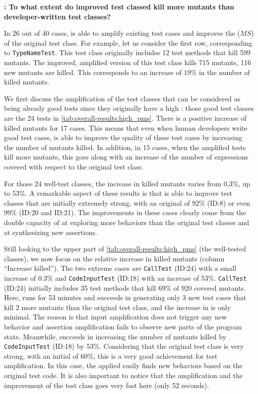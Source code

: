 \textbf{\rqeffectiveness: To what extent do improved test classed kill more mutants than developer-written test classes?}

In 26 out of 40 cases, \dspot{} is able to amplify existing test cases and improves the \ms ($MS$) of the original test class.
For example, let us consider the first row, corresponding to \texttt{TypeNameTest}. This test class originally includes 12 test methods that kill 599 mutants. The improved, amplified version of this test class kills 715 mutants, \ie{} 116 new mutants are killed. This corresponds to an increase of 19\% in the number of killed mutants.

We first discuss the amplification of the test classes that can be considered as being already good tests since they originally have a high \ms: those good test classes are the 24 tests in \autoref{tab:overall-results:high_pms}.
There is a positive increase of killed mutants for 17 cases. This means that even when human developers write good test cases, \dspot{} is able to improve the quality of these test cases by increasing the number of mutants killed. 
In addition, in 15 cases, when the amplified tests kill more mutants, this goes along with an increase of the number of expressions covered with respect to the original test class.

For those 24 well-test classes, the increase in killed mutants varies from 0,3\%, up to 53\%. A remarkable aspect of these results is that \dspot{} is able to improve test classes that are initially extremely strong, with an original \ms of 92\% (ID:8) or even 99\% (ID:20 and ID:21). The improvements in these cases clearly come from the double capacity of \dspot{} at exploring more behaviors than the original test classes and at synthesizing new assertions.

Still looking to the upper part of \autoref{tab:overall-results:high_pms} (the well-tested classes), we now focus on the relative increase in killed mutants (column ``Increase killed''). 
The two extreme cases are \texttt{CallTest} (ID:24) with a small increase of 0.3\% and \texttt{CodeInputTest} (ID:18) with an increase of 53\%.
\texttt{CallTest} (ID:24) initially includes 35 test methods that kill 69\% of 920 covered mutants. Here, \dspot{} runs for 53 minutes and succeeds in generating only 3 new test cases that kill 2 more mutants than the original test class, and the increase in \ms is only minimal. The reason is that input amplification does not trigger any new behavior and assertion amplification fails to observe new parts of the program state. 
Meanwhile, \dspot{} succeeds in increasing the number of mutants killed by \texttt{CodeInputTest} (ID:18) by 53\%. Considering that the original test class is very strong, with an initial \ms of 60\%, this is a very good achievement for test amplification. In this case, the \Iampl applied easily finds new behaviors based on the original test code.
It is also important to notice that the amplification and the improvement of the test class goes very fast here (only 52 seconds). 

